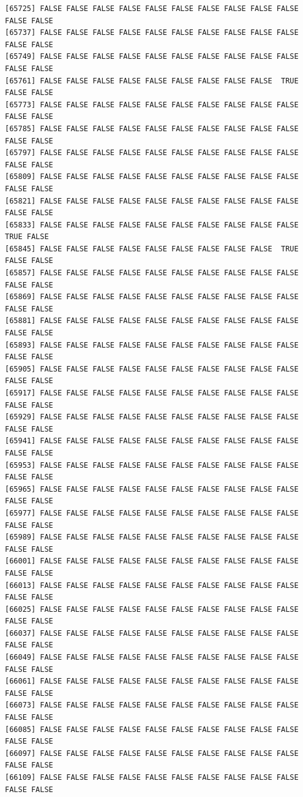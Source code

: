 \documentclass[
  a4paper,
  DIV=11,
  numbers=noendperiod]{scrartcl}
\begin{document}
\begin{verbatim}
[65725] FALSE FALSE FALSE FALSE FALSE FALSE FALSE FALSE FALSE FALSE FALSE FALSE
[65737] FALSE FALSE FALSE FALSE FALSE FALSE FALSE FALSE FALSE FALSE FALSE FALSE
[65749] FALSE FALSE FALSE FALSE FALSE FALSE FALSE FALSE FALSE FALSE FALSE FALSE
[65761] FALSE FALSE FALSE FALSE FALSE FALSE FALSE FALSE FALSE  TRUE FALSE FALSE
[65773] FALSE FALSE FALSE FALSE FALSE FALSE FALSE FALSE FALSE FALSE FALSE FALSE
[65785] FALSE FALSE FALSE FALSE FALSE FALSE FALSE FALSE FALSE FALSE FALSE FALSE
[65797] FALSE FALSE FALSE FALSE FALSE FALSE FALSE FALSE FALSE FALSE FALSE FALSE
[65809] FALSE FALSE FALSE FALSE FALSE FALSE FALSE FALSE FALSE FALSE FALSE FALSE
[65821] FALSE FALSE FALSE FALSE FALSE FALSE FALSE FALSE FALSE FALSE FALSE FALSE
[65833] FALSE FALSE FALSE FALSE FALSE FALSE FALSE FALSE FALSE FALSE  TRUE FALSE
[65845] FALSE FALSE FALSE FALSE FALSE FALSE FALSE FALSE FALSE  TRUE FALSE FALSE
[65857] FALSE FALSE FALSE FALSE FALSE FALSE FALSE FALSE FALSE FALSE FALSE FALSE
[65869] FALSE FALSE FALSE FALSE FALSE FALSE FALSE FALSE FALSE FALSE FALSE FALSE
[65881] FALSE FALSE FALSE FALSE FALSE FALSE FALSE FALSE FALSE FALSE FALSE FALSE
[65893] FALSE FALSE FALSE FALSE FALSE FALSE FALSE FALSE FALSE FALSE FALSE FALSE
[65905] FALSE FALSE FALSE FALSE FALSE FALSE FALSE FALSE FALSE FALSE FALSE FALSE
[65917] FALSE FALSE FALSE FALSE FALSE FALSE FALSE FALSE FALSE FALSE FALSE FALSE
[65929] FALSE FALSE FALSE FALSE FALSE FALSE FALSE FALSE FALSE FALSE FALSE FALSE
[65941] FALSE FALSE FALSE FALSE FALSE FALSE FALSE FALSE FALSE FALSE FALSE FALSE
[65953] FALSE FALSE FALSE FALSE FALSE FALSE FALSE FALSE FALSE FALSE FALSE FALSE
[65965] FALSE FALSE FALSE FALSE FALSE FALSE FALSE FALSE FALSE FALSE FALSE FALSE
[65977] FALSE FALSE FALSE FALSE FALSE FALSE FALSE FALSE FALSE FALSE FALSE FALSE
[65989] FALSE FALSE FALSE FALSE FALSE FALSE FALSE FALSE FALSE FALSE FALSE FALSE
[66001] FALSE FALSE FALSE FALSE FALSE FALSE FALSE FALSE FALSE FALSE FALSE FALSE
[66013] FALSE FALSE FALSE FALSE FALSE FALSE FALSE FALSE FALSE FALSE FALSE FALSE
[66025] FALSE FALSE FALSE FALSE FALSE FALSE FALSE FALSE FALSE FALSE FALSE FALSE
[66037] FALSE FALSE FALSE FALSE FALSE FALSE FALSE FALSE FALSE FALSE FALSE FALSE
[66049] FALSE FALSE FALSE FALSE FALSE FALSE FALSE FALSE FALSE FALSE FALSE FALSE
[66061] FALSE FALSE FALSE FALSE FALSE FALSE FALSE FALSE FALSE FALSE FALSE FALSE
[66073] FALSE FALSE FALSE FALSE FALSE FALSE FALSE FALSE FALSE FALSE FALSE FALSE
[66085] FALSE FALSE FALSE FALSE FALSE FALSE FALSE FALSE FALSE FALSE FALSE FALSE
[66097] FALSE FALSE FALSE FALSE FALSE FALSE FALSE FALSE FALSE FALSE FALSE FALSE
[66109] FALSE FALSE FALSE FALSE FALSE FALSE FALSE FALSE FALSE FALSE FALSE FALSE

\end{verbatim}
\end{document}
